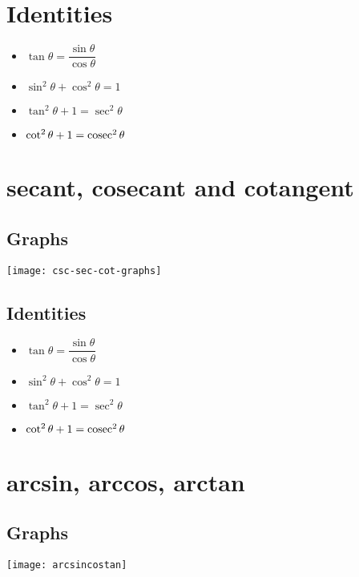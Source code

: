 \section{Identities}
\begin{itemize}
    \item $\tan \theta = \dfrac{\sin \theta}{\cos \theta}$
    \item $\sin^2 \theta + \cos^2 \theta = 1$
    \item $\tan^2 \theta + 1 = \sec^2 \theta$
    \item $\cot^2 \theta + 1 = \operatorname{cosec}^2 \theta$
\end{itemize}

\section{secant, cosecant and cotangent}
\subsection{Graphs}
\texttt{[image: csc-sec-cot-graphs]}

\subsection{Identities}
\begin{itemize}
    \item $\tan \theta = \dfrac{\sin \theta}{\cos \theta}$
    \item $\sin^2 \theta + \cos^2 \theta = 1$
    \item $\tan^2 \theta + 1 = \sec^2 \theta$
    \item $\cot^2 \theta + 1 = \operatorname{cosec}^2 \theta$
\end{itemize}

\section{arcsin, arccos, arctan}
\subsection{Graphs}
\texttt{[image: arcsincostan]}

